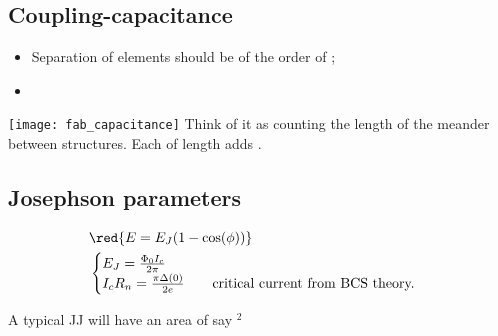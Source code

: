 \subsection{Coupling-capacitance}
\label{sec:coupling-capacitance}

\begin{framed}\noindent
  \begin{itemize}
  \item   Separation  of   elements   should  be   of   the  order   of
    ;
  \item  {}
  \end{itemize}

   \begin{center}
     \texttt{[image: fab\_capacitance]} {\small  Think of it
       as counting the length of  the meander between structures.  Each
                  of            length           adds
       .\label{fig:example-image-c}}
   \end{center}
 \end{framed}


 \subsection{Josephson parameters}
 \label{sec:josephson-parameters}
 \begin{equation}
   \label{eq:fabrication_jj_1}
   \begin{aligned}
     & \red{E = E_J(1-\cos(\phi))} \\
     & \begin{cases}
       E_J = \frac{\Phi_0I_c}{2\pi}\\
       I_cR_n =  \frac{\pi\Delta(0)}{2e} \qquad \text{critical  current from
         BCS theory.}
     \end{cases}
   \end{aligned}
 \end{equation}

 \noindent  A  typical  JJ  will  have an  area  of  say  $^{2}$


